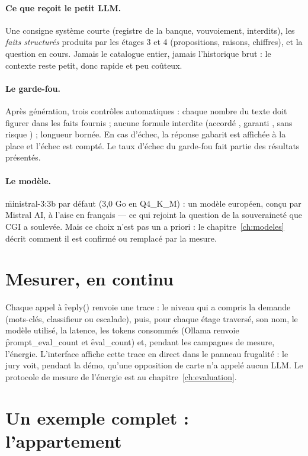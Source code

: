 \paragraph{Ce que reçoit le petit LLM.} Une consigne système courte (registre de la banque,
vouvoiement, interdits), les \emph{faits structurés} produits par les étages 3 et 4 (propositions,
raisons, chiffres), et la question en cours. Jamais le catalogue entier, jamais l'historique brut :
le contexte reste petit, donc rapide et peu coûteux.

\paragraph{Le garde-fou.} Après génération, trois contrôles automatiques : chaque nombre du texte
doit figurer dans les faits fournis ; aucune formule interdite (\og accordé \fg, \og garanti \fg,
\og sans risque \fg) ; longueur bornée. En cas d'échec, la réponse gabarit est affichée à la place
et l'échec est compté. Le taux d'échec du garde-fou fait partie des résultats présentés.

\paragraph{Le modèle.} \f{ministral-3:3b} par défaut (3,0 Go en Q4\_K\_M) : un modèle européen,
conçu par Mistral AI, à l'aise en français --- ce qui rejoint la question de la souveraineté que
CGI a soulevée. Mais ce choix n'est pas un a priori : le chapitre~\ref{ch:modeles} décrit comment
il est confirmé ou remplacé par la mesure.

\section{Mesurer, en continu}

Chaque appel à \f{reply()} renvoie une trace : le niveau qui a compris la demande (mots-clés,
classifieur ou escalade), puis, pour chaque étage traversé, son nom, le modèle utilisé, la latence, les tokens consommés (Ollama renvoie \f{prompt\_eval\_count} et
\f{eval\_count}) et, pendant les campagnes de mesure, l'énergie. L'interface affiche cette trace en
direct dans le panneau \og frugalité \fg{} : le jury voit, pendant la démo, qu'une opposition de
carte n'a appelé aucun LLM. Le protocole de mesure de l'énergie est au chapitre~\ref{ch:evaluation}.

\section{Un exemple complet : l'appartement}

